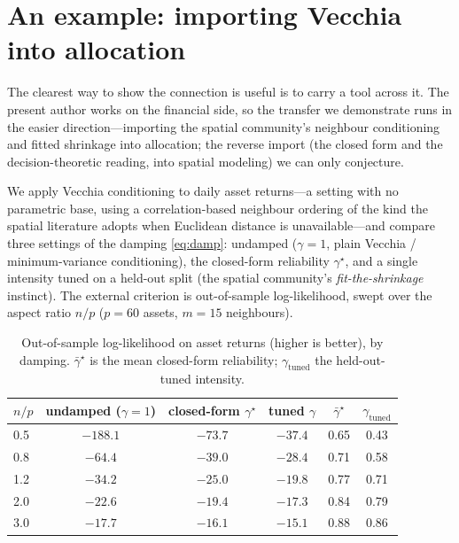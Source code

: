 \documentclass[11pt]{article}
\newcommand{\gstar}{\gamma^\star}
\begin{document}
\section{An example: importing Vecchia into allocation}
The clearest way to show the connection is useful is to carry a tool across it. The present author
works on the financial side, so the transfer we demonstrate runs in the easier direction---importing
the spatial community's neighbour conditioning and fitted shrinkage into allocation; the reverse import
(the closed form and the decision-theoretic reading, into spatial modeling) we can only conjecture.

We apply Vecchia conditioning to daily asset returns---a setting with no parametric base, using a
correlation-based neighbour ordering of the kind the spatial literature adopts when Euclidean distance
is unavailable---and compare three settings of the damping \eqref{eq:damp}: undamped ($\gamma=1$, plain
Vecchia / minimum-variance conditioning), the closed-form reliability $\gstar$, and a single intensity
tuned on a held-out split (the spatial community's \emph{fit-the-shrinkage} instinct). The external
criterion is out-of-sample log-likelihood, swept over the aspect ratio $n/p$ ($p=60$ assets,
$m=15$ neighbours).

\begin{table}[h]\centering\small
\caption{Out-of-sample log-likelihood on asset returns (higher is better), by damping. $\bar\gstar$ is
the mean closed-form reliability; $\gamma_{\text{tuned}}$ the held-out-tuned intensity.}\label{tab:exp}
\begin{tabular}{lccccc}
\toprule
$n/p$ & undamped ($\gamma{=}1$) & closed-form $\gstar$ & tuned $\gamma$ & $\bar\gstar$ & $\gamma_{\text{tuned}}$\\
\midrule
0.5 & $-188.1$ & $-73.7$ & $\mathbf{-37.4}$ & 0.65 & 0.43\\
0.8 & $-64.4$  & $-39.0$ & $\mathbf{-28.4}$ & 0.71 & 0.58\\
1.2 & $-34.2$  & $-25.0$ & $\mathbf{-19.8}$ & 0.77 & 0.71\\
2.0 & $-22.6$  & $-19.4$ & $\mathbf{-17.3}$ & 0.84 & 0.79\\
3.0 & $-17.7$  & $-16.1$ & $\mathbf{-15.1}$ & 0.88 & 0.86\\
\bottomrule
\end{tabular}
\end{table}
\end{document}
